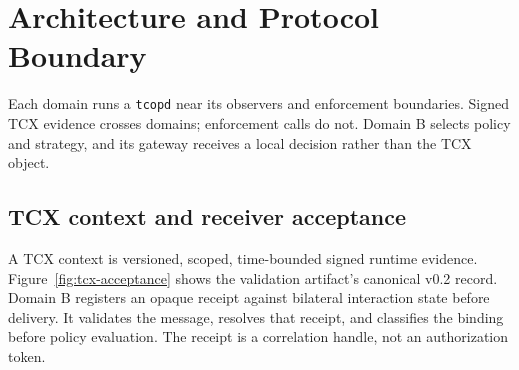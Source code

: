 \section{Architecture and Protocol Boundary}

Each domain runs a \texttt{tcopd} near its observers and enforcement boundaries. Signed TCX evidence crosses domains; enforcement calls do not. Domain B selects policy and strategy, and its gateway receives a local decision rather than the TCX object.

\subsection{TCX context and receiver acceptance}

A TCX context is versioned, scoped, time-bounded signed runtime evidence. Figure~\ref{fig:tcx-acceptance} shows the validation artifact's canonical v0.2 record. Domain B registers an opaque receipt against bilateral interaction state before delivery. It validates the message, resolves that receipt, and classifies the binding before policy evaluation. The receipt is a correlation handle, not an authorization token.

